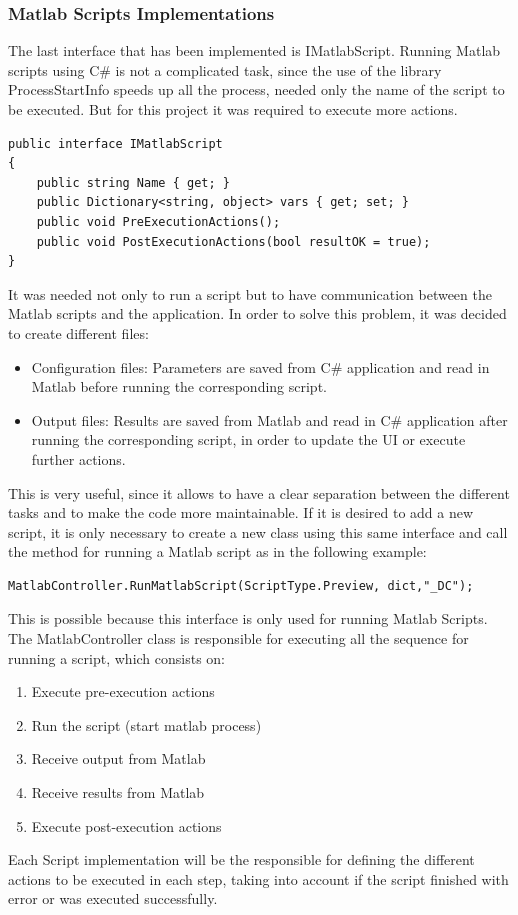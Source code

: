 \subsubsection{Matlab Scripts Implementations}
The last interface that has been implemented is IMatlabScript. Running Matlab scripts using C\# is not a complicated task, since the use of the library ProcessStartInfo speeds up all the process, needed only the name of the script to be executed. But for this project it was required to execute more actions.\smallskip\\
\begin{lstlisting}
public interface IMatlabScript
{
    public string Name { get; }
    public Dictionary<string, object> vars { get; set; }
    public void PreExecutionActions();
    public void PostExecutionActions(bool resultOK = true);
}
\end{lstlisting}
It was needed not only to run a script but to have communication between the Matlab scripts and the application. In order to solve this problem, it was decided to create different files:
\begin{itemize}
    \item Configuration files: Parameters are saved from C\# application and read in Matlab before running the corresponding script.
    \item Output files: Results are saved from Matlab and read in C\# application after running the corresponding script, in order to update the UI or execute further actions.
\end{itemize}
This is very useful, since it allows to have a clear separation between the different tasks and to make the code more maintainable. If it is desired to add a new script, it is only necessary to create a new class using this same interface and call the method for running a Matlab script as in the following example:
\begin{lstlisting}
MatlabController.RunMatlabScript(ScriptType.Preview, dict,"_DC");
\end{lstlisting}
This is possible because this interface is only used for running Matlab Scripts. The MatlabController class is responsible for executing all the sequence for running a script, which consists on:
\begin{enumerate}
    \item Execute pre-execution actions
    \item Run the script (start matlab process)
    \item Receive output from Matlab
    \item Receive results from Matlab
    \item Execute post-execution actions
\end{enumerate}
Each Script implementation will be the responsible for defining the different actions to be executed in each step, taking into account if the script finished with error or was executed successfully.
